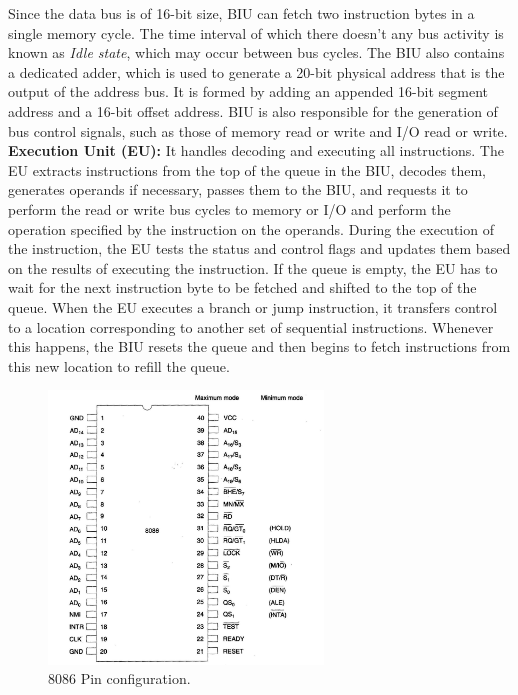 \documentclass[12pt, a4paper]{scrartcl}
\begin{document}
	Since the data bus is of 16-bit size, BIU can fetch two instruction bytes in a single memory cycle. The time interval of which there doesn't any bus activity is known as \textit{Idle state}, which may occur between bus cycles. The BIU also contains a dedicated adder, which is used to generate a 20-bit physical address that is the output of the address bus. It is formed by adding an appended 16-bit segment address and a 16-bit offset address. BIU is also responsible for the generation of bus control signals, such as those of memory read or write and I/O read or write. \\

	\textbf{Execution Unit (EU): }It handles decoding and executing all instructions. The EU extracts instructions from the top of the queue in the BIU, decodes them, generates operands if necessary, passes them to the BIU, and requests it to perform the read or write bus cycles to memory or I/O and perform the operation specified by the instruction on the operands. During the execution of the instruction, the EU tests the status and control flags and updates them based on the results of executing the instruction. If the queue is empty, the EU has to wait for the next instruction byte to be fetched and shifted to the top of the queue. When the EU executes a branch or jump instruction, it transfers control to a location corresponding to another set of sequential instructions. Whenever this happens, the BIU resets the queue and then begins to fetch instructions from this new location to refill the queue.

	\begin{figure}[h]
		\centering
		\includegraphics[width=0.65\textwidth]{images/8086-pin-configuration.png}
		\caption{8086 Pin configuration.}
		\label{image-3}
	\end{figure}
\end{document}
